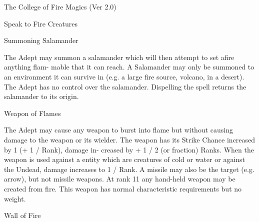 \begin{Chapter}{The College of Fire Magics (Ver 2.0)}
\begin{spell}[S-10]{Speak to Fire Creatures }
\begin{effects}
\end{effects}
\end{spell}

\begin{spell}[S-11]{Summoning Salamander }

\begin{effects}
 The  Adept  may  summon  a  salamander 
which will then attempt to set afire anything flam-
mable that it can reach. A Salamander may only be 
summoned to an environment it can survive in (e.g. 
a large fire source, volcano, in a desert). The Adept 
has no control over the salamander. Dispelling the 
spell returns the salamander to its origin. 

\end{effects}
\end{spell}

\begin{spell}[S-12]{Weapon of Flames }

\begin{effects}
The Adept may cause any weapon to burst 
into  flame  but  without  causing  damage  to  the 
weapon  or  its  wielder.  The  weapon  has  its  Strike 
Chance  increased  by  1  (+  1  /  Rank),  damage  in-
creased  by  +  1  /  2  (or  fraction)  Ranks.  When  the 
weapon is used against a entity which are creatures 
of  cold  or  water  or  against  the  Undead,  damage 
increases  to  1  /  Rank.  A  missile  may  also  be  the 
target  (e.g.  arrow),  but  not  missile  weapons.  At 
rank  11  any  hand-held  weapon  may  be  created 
from  fire.  This  weapon  has  normal  characteristic 
requirements but no weight. 

\end{effects}
\end{spell}

\begin{spell}[S-13]{Wall of Fire }



\end{spell}
\end{Chapter}
